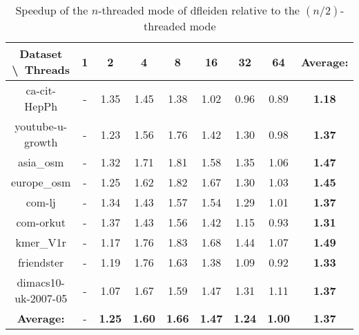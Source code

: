 \begin{table}[H]
	\centering
	\begin{tabular}{|c|c|c|c|c|c|c|c|c|}
		\hline
		Dataset \textbackslash\ Threads& 1 & 2 & 4 & 8 & 16 & 32 & 64 & \textbf{Average:} \\
		\hline
		ca-cit-HepPh & - & 1.35 & 1.45 & 1.38 & 1.02 & 0.96 & 0.89 & \textbf{1.18} \\
		\hline
		youtube-u-growth & - & 1.23 & 1.56 & 1.76 & 1.42 & 1.30 & 0.98 & \textbf{1.37} \\
		\hline
		asia\_osm & - & 1.32 & 1.71 & 1.81 & 1.58 & 1.35 & 1.06 & \textbf{1.47} \\
		\hline
		europe\_osm & - & 1.25 & 1.62 & 1.82 & 1.67 & 1.30 & 1.03 & \textbf{1.45} \\
		\hline
		com-lj & - & 1.34 & 1.43 & 1.57 & 1.54 & 1.29 & 1.01 & \textbf{1.37} \\
		\hline
		com-orkut & - & 1.37 & 1.43 & 1.56 & 1.42 & 1.15 & 0.93 & \textbf{1.31} \\
		\hline
		kmer\_V1r & - & 1.17 & 1.76 & 1.83 & 1.68 & 1.44 & 1.07 & \textbf{1.49} \\
		\hline
		friendster & - & 1.19 & 1.76 & 1.63 & 1.38 & 1.09 & 0.92 & \textbf{1.33} \\
		\hline
		dimacs10-uk-2007-05 & - & 1.07 & 1.67 & 1.59 & 1.47 & 1.31 & 1.11 & \textbf{1.37} \\
		\hline
		\textbf{Average:} & - & \textbf{1.25} & \textbf{1.60} & \textbf{1.66} & \textbf{1.47} & \textbf{1.24} & \textbf{1.00} & \textbf{1.37} \\
		\hline
	\end{tabular}
\caption{Speedup of the $n$-threaded mode of dfleiden relative to the $(n/2)$-threaded mode}
\label{T:relative speedup for dfleiden}
\end{table}